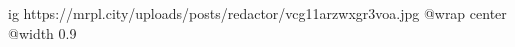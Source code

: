  
 
 
 
 

\ifcmt
  ig https://mrpl.city/uploads/posts/redactor/vcg11arzwxgr3voa.jpg
  @wrap center
  @width 0.9
\fi
